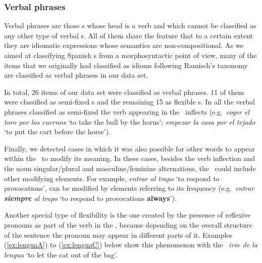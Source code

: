 \documentclass[output=paper]{langsci/langscibook}
\begin{document}
\subsubsection{Verbal phrases}
\label{ssec:verbal-phrases}

Verbal phrases are those \mwe s whose head is a verb and which cannot be classified as any other type of verbal \mwe s.
All of them share the feature that to a certain extent they are idiomatic expressions whose semantics are non-composition\-al. 
As we aimed at classifying Spanish \mwe s from a morphosyntactic point of view, many of the items that we originally had classified as idioms following Ramisch's taxonomy \citeyearpar{Ramisch:2012,Ramisch:2015} are classified as verbal phrases in our data set.

In total, 26 items of our data set were classified as verbal phrases.
11 of them were classified as semi-fixed \mwe s and the remaining 15 as flexible \mwe s. 
In all the verbal phrases classified as semi-fixed the verb appearing in the \mwe\ inflects (e.g.\  \textit{coger el toro por los cuernos} `to take the bull by the horns'; \textit{empezar la casa por el tejado} `to put the cart before the horse'). 

Finally, we detected cases in which it was also possible for other words to appear within the \mwe\ to modify its meaning.
In these cases, besides the verb inflection and the noun singular/plural and masculine/feminine alternations, the \mwe\ could include other modifying elements. 
For example, \textit{entrar al trapo} `to respond to provocations', can be modified by elements referring to its frequency (e.g.\ \textit{entrar \textbf{siempre} al trapo} `to respond to provocations \textbf{always}').

Another special type of flexibility is the one created by the presence of reflexive pronouns as part of the verb in the \mwe, because depending on the overall structure of the sentence the pronoun may appear in different parts of it.
Examples (\ref{ex:lenguaA}) to (\ref{ex:lenguaC}) below show this phenomenon with the \mwe\ \textit{irse de la lengua} `to let the cat out of the bag'.
\end{document}
